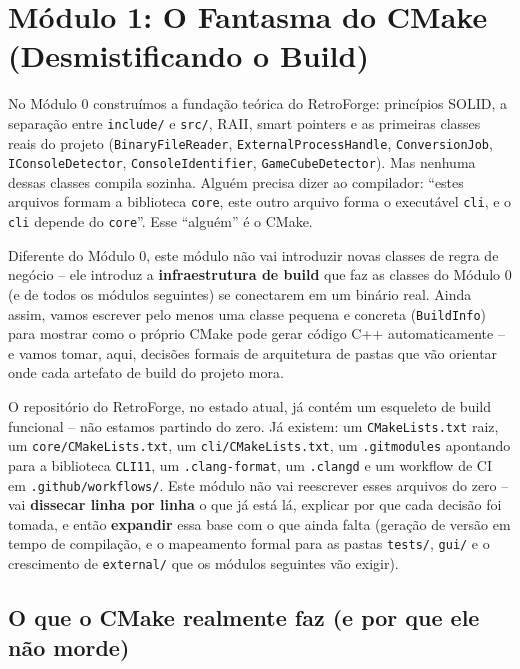 \section{Módulo 1: O Fantasma do CMake (Desmistificando o Build)}

No Módulo 0 construímos a fundação teórica do RetroForge: princípios SOLID, a separação entre \texttt{include/} e \texttt{src/}, RAII, smart pointers e as primeiras classes reais do projeto (\texttt{BinaryFileReader}, \texttt{ExternalProcessHandle}, \texttt{ConversionJob}, \texttt{IConsoleDetector}, \texttt{ConsoleIdentifier}, \texttt{GameCubeDetector}). Mas nenhuma dessas classes compila sozinha. Alguém precisa dizer ao compilador: ``estes arquivos formam a biblioteca \texttt{core}, este outro arquivo forma o executável \texttt{cli}, e o \texttt{cli} depende do \texttt{core}''. Esse ``alguém'' é o CMake.

Diferente do Módulo 0, este módulo não vai introduzir novas classes de regra de negócio -- ele introduz a \textbf{infraestrutura de build} que faz as classes do Módulo 0 (e de todos os módulos seguintes) se conectarem em um binário real. Ainda assim, vamos escrever pelo menos uma classe pequena e concreta (\texttt{BuildInfo}) para mostrar como o próprio CMake pode gerar código C++ automaticamente -- e vamos tomar, aqui, decisões formais de arquitetura de pastas que vão orientar onde cada artefato de build do projeto mora.

\begin{CaixaInfo}[title={O que já existe vs. o que este módulo formaliza}]
O repositório do RetroForge, no estado atual, já contém um esqueleto de build funcional -- não estamos partindo do zero. Já existem: um \texttt{CMakeLists.txt} raiz, um \texttt{core/CMakeLists.txt}, um \texttt{cli/CMakeLists.txt}, um \texttt{.gitmodules} apontando para a biblioteca \texttt{CLI11}, um \texttt{.clang-format}, um \texttt{.clangd} e um workflow de CI em \texttt{.github/workflows/}. Este módulo não vai reescrever esses arquivos do zero -- vai \textbf{dissecar linha por linha} o que já está lá, explicar por que cada decisão foi tomada, e então \textbf{expandir} essa base com o que ainda falta (geração de versão em tempo de compilação, e o mapeamento formal para as pastas \texttt{tests/}, \texttt{gui/} e o crescimento de \texttt{external/} que os módulos seguintes vão exigir).
\end{CaixaInfo}

\subsection{O que o CMake realmente faz (e por que ele não morde)}

